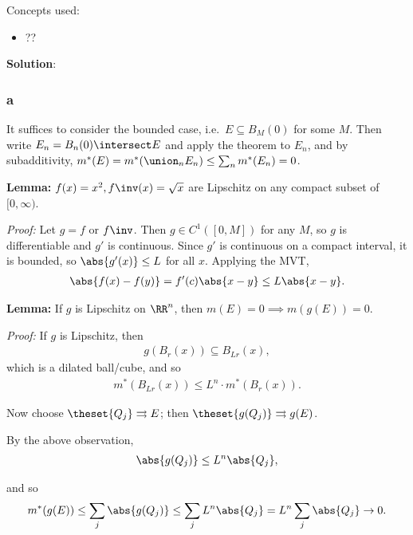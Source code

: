 \begin{solution}

Concepts used:

\begin{itemize}
\tightlist
\item
  ??
\end{itemize}

\textbf{Solution}:

\hypertarget{a-8}{%
\subsubsection{a}\label{a-8}}

It suffices to consider the bounded case, i.e.~\(E \subseteq B_M(0)\)
for some \(M\). Then write \(E_n = B_n(0) \intersect E\) and apply the
theorem to \(E_n\), and by subadditivity,
\(m^*(E) = m^*(\union_n E_n) \leq \sum_n m^*(E_n) = 0\).

\textbf{Lemma:} \(f(x) = x^2, f\inv(x) = \sqrt{x}\) are Lipschitz on any
compact subset of \([0, \infty)\).

\emph{Proof:} Let \(g = f\) or \(f\inv\). Then \(g\in C^1([0, M])\) for
any \(M\), so \(g\) is differentiable and \(g'\) is continuous. Since
\(g'\) is continuous on a compact interval, it is bounded, so
\(\abs{g'(x)} \leq L\) for all \(x\). Applying the MVT,
\begin{align*}
\abs{f(x) - f(y)} = f'(c) \abs{x-y} \leq L \abs{x-y}
.\end{align*}

\textbf{Lemma:} If \(g\) is Lipschitz on \(\RR^n\), then
\(m(E) = 0 \implies m(g(E)) = 0\).

\emph{Proof:} If \(g\) is Lipschitz, then
\begin{align*}
g(B_r(x)) \subseteq B_{Lr}(x)
,\end{align*} which is a dilated ball/cube, and so
\begin{align*}
m^*(B_{Lr}(x)) \leq L^n \cdot m^*(B_{r}(x))
.\end{align*}

Now choose \(\theset{Q_j} \rightrightarrows E\); then
\(\theset{g(Q_j)} \rightrightarrows g(E)\).

By the above observation,
\begin{align*}
\abs{g(Q_j)} \leq L^n \abs{Q_j}
,\end{align*}

and so
\begin{align*}
m^*(g(E)) \leq \sum_j \abs{g(Q_j)} \leq \sum_j L^n \abs{Q_j} = L^n \sum_j \abs{Q_j} \to 0 
.\end{align*}


\end{solution}
